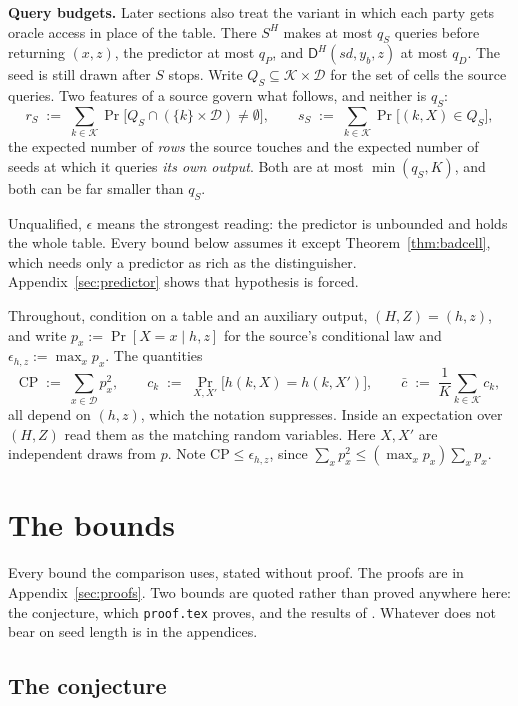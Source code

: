 \documentclass{aicr-solution}
\newcommand{\sd}{\mathit{sd}}
\newcommand{\calK}{\mathcal{K}}
\newcommand{\calD}{\mathcal{D}}
\newcommand{\CP}{\mathrm{CP}}
\begin{document}
\medskip
\noindent\textbf{Query budgets.} Later sections also treat the variant in which each party gets
oracle access in place of the table. There $S^{H}$ makes at most $q_S$ queries before returning
$(x,z)$, the predictor at most $q_P$, and $\mathsf{D}^{H}(\sd,y_b,z)$ at most $q_D$. The seed is
still drawn after $S$ stops. Write $Q_S \subseteq \calK\times\calD$ for the set of cells the source
queries. Two features of a source govern what follows, and neither is $q_S$:
\begin{equation}\label{eq:rs-ss}
  r_S \;:=\; \sum_{k \in \calK} \Pr\bigl[Q_S \cap (\{k\}\times\calD) \neq \emptyset\bigr] ,
  \qquad
  s_S \;:=\; \sum_{k \in \calK} \Pr\bigl[(k,X) \in Q_S\bigr] ,
\end{equation}
the expected number of \emph{rows} the source touches and the expected number of seeds at which it
queries \emph{its own output}. Both are at most $\min(q_S,K)$, and both can be far smaller than
$q_S$.

Unqualified, $\epsilon$ means the strongest reading: the predictor is unbounded and holds the whole
table. Every bound below assumes it except Theorem~\ref{thm:badcell}, which needs only a predictor
as rich as the distinguisher. Appendix~\ref{sec:predictor} shows that hypothesis is forced.

\medskip
Throughout, condition on a table and an auxiliary output, $(H,Z) = (h,z)$, and write
$p_x := \Pr[X = x \mid h, z]$ for the source's conditional law and $\epsilon_{h,z} := \max_x p_x$.
The quantities
\[
  \CP \;:=\; \sum_{x \in \calD} p_x^2 ,
  \qquad
  c_k \;:=\; \Pr_{X,X'}\bigl[h(k,X) = h(k,X')\bigr] ,
  \qquad
  \bar c \;:=\; \frac1K \sum_{k \in \calK} c_k ,
\]
all depend on $(h,z)$, which the notation suppresses. Inside an expectation over $(H,Z)$ read them
as the matching random variables. Here $X, X'$ are independent draws from $p$. Note
$\CP \le \epsilon_{h,z}$, since $\sum_x p_x^2 \le (\max_x p_x)\sum_x p_x$.

\section{The bounds}\label{sec:bounds}

Every bound the comparison uses, stated without proof. The proofs are in
Appendix~\ref{sec:proofs}. Two bounds are quoted rather than proved anywhere here: the conjecture,
which \texttt{proof.tex} proves, and the results of \cite{BDKPPSY11}. Whatever does not bear on
seed length is in the appendices.

\subsection*{The conjecture}
\end{document}
